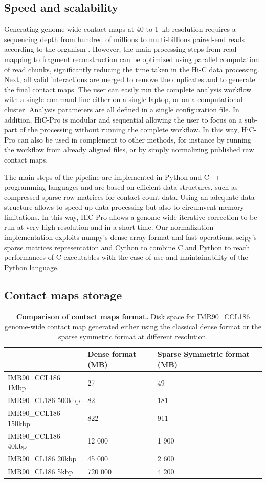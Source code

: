 \subsection{Speed and scalability}

Generating genome-wide contact maps at 40 to 1~kb resolution requires a
sequencing depth from hundred of millions to multi-billions paired-end reads
according to the organism \citep{dixon:topological, rao:3d}. However, the main
processing steps from read mapping to fragment reconstruction can be optimized
using parallel computation of read chunks, significantly reducing the time
taken in the Hi-C data processing. Next, all valid interactions are merged to
remove the duplicates and to generate the final contact maps. The user can
easily run the complete analysis workflow with a single command-line either on
a single laptop, or on a computational cluster. Analysis parameters are all
defined in a single configuration file. In addition, HiC-Pro is modular and
sequential allowing the user to focus on a sub-part of the processing without
running the complete workflow. In this way, HiC-Pro can also be used in
complement to other methods, for instance by running the workflow from already
aligned files, or by simply normalizing published raw contact maps.

The main steps of the pipeline are implemented in Python and C++ programming
languages and are based on efficient data structures, such as compressed
sparse row matrices for contact count data. Using an adequate data structure
allows to speed up data processing but also to circumvent memory limitations.
In this way, HiC-Pro allows a genome wide iterative correction to be run at
very high resolution and in a short time. Our normalization implementation
exploits numpy’s dense array format and fast operations, scipy’s sparse
matrices representation and Cython to combine C and Python to reach
performances of C executables with the ease of use and maintainability of the
Python language.

\subsection{Contact maps storage}

\begin{table}
\begin{tabular}{lll}
\hline
& Dense format (MB) & Sparse Symmetric format (MB) \\
\hline
IMR90\_CCL186 1Mbp & 27 & 49 \\
IMR90\_CL186 500kbp & 82 & 181 \\
IMR90\_CCL186 150kbp & 822 & 911 \\
IMR90\_CCL186 40kbp & 12 000 & 1 900 \\
IMR90\_CL186 20kbp & 45 000 & 2 600 \\
IMR90\_CL186 5kbp & 720 000 & 4 200 \\
\end{tabular}
\caption{\textbf{Comparison of contact maps format.} Disk space for
IMR90\_CCL186 genome-wide contact map generated either using the classical
dense format or the sparse symmetric format at different resolution.}
\label{table:table2}
\end{table}

